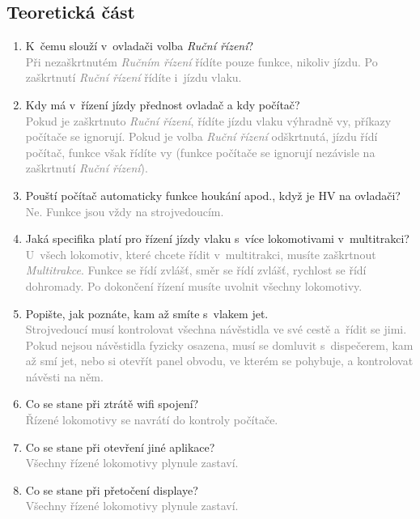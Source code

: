 \documentclass[12pt,a4paper]{article}
\newcommand{\solution}[1]{\\ \textcolor{gray}{#1}}
\newcommand{\solution}[1]{}
\begin{document}
\subsection{Teoretická část}
\begin{enumerate}[leftmargin=*]
\item K~čemu slouží v~ovladači volba \textit{Ruční řízení}?
\solution{Při nezaškrtnutém \textit{Ručním řízení} řídíte pouze funkce, nikoliv
jízdu. Po zaškrtnutí \textit{Ruční řízení} řídíte i~jízdu vlaku.}

\item Kdy má v~řízení jízdy přednost ovladač a kdy počítač?
\solution{Pokud je zaškrtnuto \textit{Ruční řízení}, řídíte jízdu vlaku
výhradně vy, příkazy počítače se ignorují. Pokud je volba \textit{Ruční řízení}
odškrtnutá, jízdu řídí počítač, funkce však řídíte vy (funkce počítače se
ignorují nezávisle na zaškrtnutí \textit{Ruční řízení}).}

\item Pouští počítač automaticky funkce houkání apod., když je HV na ovladači?
\solution{Ne. Funkce jsou vždy na strojvedoucím.}

\item Jaká specifika platí pro řízení jízdy vlaku s~více lokomotivami v~multitrakci?
\solution{U~všech lokomotiv, které chcete řídit v~multitrakci, musíte
zaškrtnout \textit{Multitrakce}. Funkce se řídí zvlášť, směr se řídí zvlášť,
rychlost se řídí dohromady. Po dokončení řízení musíte uvolnit všechny
lokomotivy.}

\item Popište, jak poznáte, kam až smíte s~vlakem jet.
\solution{Strojvedoucí musí kontrolovat všechna návěstidla ve své cestě a~řídit
se jimi. Pokud nejsou návěstidla fyzicky osazena, musí se domluvit
s~dispečerem, kam až smí jet, nebo si otevřít panel obvodu, ve kterém se
pohybuje, a kontrolovat návěsti na něm.}

\item Co se stane při ztrátě wifi spojení?
\solution{Řízené lokomotivy se navrátí do kontroly počítače.}

\item Co se stane při otevření jiné aplikace?
\solution{Všechny řízené lokomotivy plynule zastaví.}

\item Co se stane při přetočení displaye?
\solution{Všechny řízené lokomotivy plynule zastaví.}

\end{enumerate}
\end{document}

